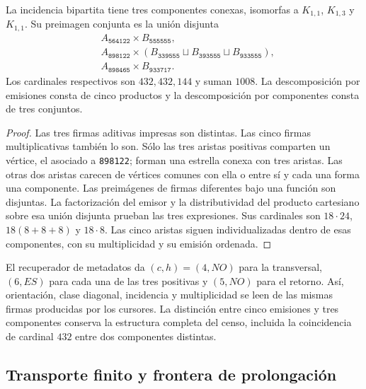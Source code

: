 \begin{theorem}
La incidencia bipartita tiene tres componentes conexas, isomorfas a
$K_{1,1}$, $K_{1,3}$ y $K_{1,1}$. Su preimagen conjunta es la unión
disjunta
\begin{align*}
 &A_{\texttt{564122}}\times B_{\texttt{555555}},\\
 &A_{\texttt{898122}}\times
  (B_{\texttt{339555}}\sqcup B_{\texttt{393555}}
     \sqcup B_{\texttt{933555}}),\\
 &A_{\texttt{898465}}\times B_{\texttt{933717}}.
\end{align*}
Los cardinales respectivos son $432,432,144$ y suman $1008$.
La descomposición por emisiones consta de cinco productos y la
descomposición por componentes consta de tres conjuntos.
\end{theorem}
\begin{proof}
Las tres firmas aditivas impresas son distintas. Las cinco firmas
multiplicativas también lo son. Sólo las tres aristas positivas comparten
un vértice, el asociado a \texttt{898122}; forman una estrella conexa
con tres aristas. Las otras dos aristas carecen de vértices comunes con
ella o entre sí y cada una forma una componente. Las preimágenes de
firmas diferentes bajo una función son disjuntas. La factorización del
emisor y la distributividad del producto cartesiano sobre esa unión
disjunta prueban las tres expresiones. Sus cardinales son
$18\cdot24$, $18(8+8+8)$ y $18\cdot8$. Las cinco aristas siguen
individualizadas dentro de esas componentes, con su multiplicidad y su
emisión ordenada.
\end{proof}

El recuperador de metadatos da $(c,h)=(4,NO)$ para la transversal,
$(6,ES)$ para cada una de las tres positivas y $(5,NO)$ para el retorno.
Así, orientación, clase diagonal, incidencia y multiplicidad se leen de
las mismas firmas producidas por los cursores. La distinción entre cinco
emisiones y tres componentes conserva la estructura completa del censo,
incluida la coincidencia de cardinal $432$ entre dos componentes distintas.

\subsection{Transporte finito y frontera de prolongación}

